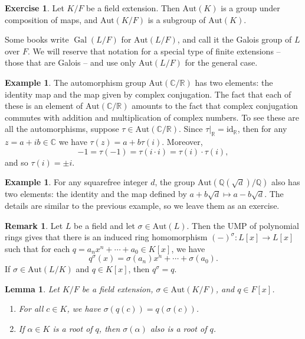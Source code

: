 \documentclass[12pt]{report}
\newtheorem{lemma}[theorem]{Lemma}
\numberwithin{equation}{section}
\numberwithin{theorem}{chapter}
\theoremstyle{definition}
\newtheorem{example}[theorem]{Example}
\newtheorem{exercise}{Exercise}
\newtheorem*{basic properties}{Basic Properties}
\newtheorem*{Important Remark}{Important Remark}
\newtheorem{remark}[theorem]{Remark}
\DeclareMathOperator{\Gal}{Gal}
\newcommand{\C}{\mathbb{C}}
\begin{document}
 
\begin{exercise} 
	Let $K/F$ be a field extension. Then $\mathrm{Aut}(K)$ is a group under composition of maps, and $\mathrm{Aut}(K/F)$ is a subgroup of $\mathrm{Aut}(K)$.
\end{exercise}


Some books write $\Gal(L/F)$ for $\mathrm{Aut}(L/F)$, and call it the Galois group of $L$ over $F$. We will reserve that notation for a special type of finite extensions -- those that are Galois -- and use only $\mathrm{Aut}(L/F)$ for the general case.


\begin{example}\label{example aut C over R}
The automorphism group $\mathrm{Aut}(\C/\mathbb{R})$ has two elements: the identity map and the map given by complex conjugation. The fact that each of these is an element of $\mathrm{Aut}(\C/\mathbb{R})$ amounts to the fact that complex conjugation commutes with addition and multiplication of complex numbers.
To see these are all the automorphisms, suppose $\tau \in \mathrm{Aut}(\C/\mathbb{R})$. Since $\tau|_\mathbb{R} = \mathrm{id}_\mathbb{R}$, then for any $z = a + ib \in \C$ we have $\tau(z) = a + b \tau(i)$. Moreover, 
$$-1 =\tau(-1) = \tau(i \cdot i) = \tau(i) \cdot \tau(i),$$ 
and so $\tau(i) =\pm i$.
\end{example}



\begin{example}
For any squarefree integer $d$, the group $\mathrm{Aut}(\mathbb{Q}(\sqrt{d})/\mathbb{Q})$ also has two elements: the identity and the map defined by $a + b \sqrt{d} \mapsto a - b \sqrt{d}$. The details are similar to the previous example, so we leave them as an exercise.
\end{example}

\begin{remark}\index{$(-)^\sigma$}\label{remark sigma}
Let $L$ be a field and let $\sigma \in \mathrm{Aut}(L)$. Then the UMP of polynomial rings gives that there is an induced ring homomorphism $(-)^\sigma\!:L[x]\to L[x]$ such that for each $q = a_nx^n + \cdots + a_0 \in K[x]$, we have
$$q^\sigma(x) = \sigma(a_n)x^n + \cdots + \sigma(a_0).$$ 
If $\sigma \in \mathrm{Aut}(L/K)$ and $q \in K[x]$, then $q^\sigma = q$.
\end{remark}


\begin{lemma}\label{lemma roots}
Let $K/F$ be a field extension, $\sigma \in \mathrm{Aut}(K/F)$, and $q \in F[x]$. 
\begin{enumerate}[label=\alph*),leftmargin=15pt]
\item For all $c \in K$, we have $\sigma(q(c))=q(\sigma(c))$. 
\item If $\alpha \in K$ is a root of $q$, then $\sigma(\alpha)$ also is a root of $q$.
\end{enumerate}
\end{lemma}
\end{document}
